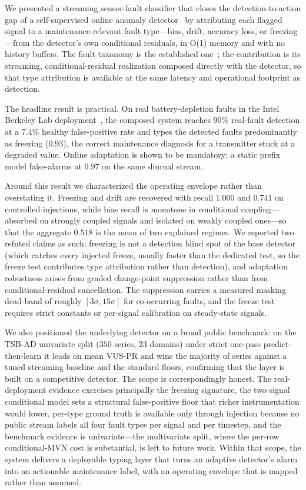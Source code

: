 We presented a streaming sensor-fault classifier that closes the detection-to-action gap of a self-supervised online anomaly detector~\citep{Wadinger2023} by attributing each flagged signal to a maintenance-relevant fault type---bias, drift, accuracy loss, or freezing---from the detector's own conditional residuals, in O(1) memory and with no history buffers. The fault taxonomy is the established one~\citep{Sharma2010,Ni2009}; the contribution is its streaming, conditional-residual realization composed directly with the detector, so that type attribution is available at the same latency and operational footprint as detection.

The headline result is practical. On real battery-depletion faults in the Intel Berkeley Lab deployment~\citep{IntelLab2004}, the composed system reaches $90\%$ real-fault detection at a $7.4\%$ healthy false-positive rate and types the detected faults predominantly as freezing ($0.93$), the correct maintenance diagnosis for a transmitter stuck at a degraded value. Online adaptation is shown to be mandatory: a static prefix model false-alarms at $0.97$ on the same diurnal stream.

Around this result we characterized the operating envelope rather than overstating it. Freezing and drift are recovered with recall $1.000$ and $0.741$ on controlled injections, while bias recall is monotone in conditional coupling---absorbed on strongly coupled signals and isolated on weakly coupled ones---so that the aggregate $0.518$ is the mean of two explained regimes. We reported two refuted claims as such: freezing is not a detection blind spot of the base detector (which catches every injected freeze, usually faster than the dedicated test, so the freeze test contributes type attribution rather than detection), and adaptation robustness arises from graded change-point suppression rather than from conditional-residual cancellation. The suppression carries a measured masking dead-band of roughly $[3\sigma, 15\sigma]$ for co-occurring faults, and the freeze test requires strict constants or per-signal calibration on steady-state signals.

We also positioned the underlying detector on a broad public benchmark: on the TSB-AD univariate split ($350$ series, $23$ domains) under strict one-pass predict-then-learn it leads on mean VUS-PR and wins the majority of series against a tuned streaming baseline and the standard floors, confirming that the layer is built on a competitive detector. The scope is correspondingly honest. The real-deployment evidence exercises principally the freezing signature, the two-signal conditional model sets a structural false-positive floor that richer instrumentation would lower, per-type ground truth is available only through injection because no public stream labels all four fault types per signal and per timestep, and the benchmark evidence is univariate---the multivariate split, where the per-row conditional-MVN cost is substantial, is left to future work. Within that scope, the system delivers a deployable typing layer that turns an adaptive detector's alarm into an actionable maintenance label, with an operating envelope that is mapped rather than assumed.
